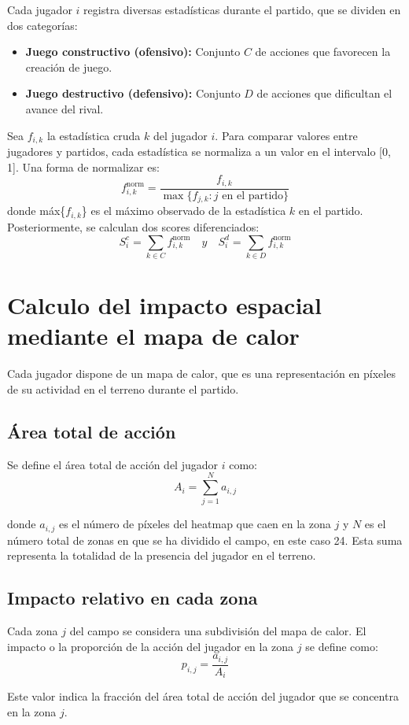 Cada jugador $i$ registra diversas estadísticas durante el partido, que se dividen en dos
categorías:

\begin{itemize}
    \item \textbf{Juego constructivo (ofensivo):} Conjunto $C$ de acciones que favorecen la creación de juego.
    \item \textbf{Juego destructivo (defensivo):} Conjunto $D$ de acciones que dificultan el avance del rival.
\end{itemize}

Sea $f_{i,k}$ la estadística cruda $k$ del jugador $i$. Para comparar valores entre jugadores y
partidos, cada estadística se normaliza a un valor en el intervalo [0, 1]. Una forma de
normalizar es:
\[
f_{i,k}^{\text{norm}} = \frac{f_{i,k}}{\max\{f_{j,k} : j \text{ en el partido}\}}
\]
donde máx\{$f_{i,k}$\} es el máximo observado de la estadística $k$ en el partido.
Posteriormente, se calculan dos scores diferenciados:
\[
S_i^c = \sum_{k \in C} f_{i,k}^{\text{norm}} \quad y \quad S_i^d = \sum_{k \in D} f_{i,k}^{\text{norm}}
\]

\section{Calculo del impacto espacial mediante el mapa de calor}
Cada jugador dispone de un mapa de calor, que es una representación en píxeles de su
actividad en el terreno durante el partido.
\subsection*{Área total de acción}
Se define el área total de acción del jugador $i$ como:
\[
A_i = \sum_{j=1}^{N} a_{i,j}
\]

donde $a_{i,j}$ es el número de píxeles del heatmap que caen en la zona $j$ y $N$ es el número total de zonas en que se ha dividido el campo, en este caso 24. Esta suma representa la
totalidad de la presencia del jugador en el terreno.

\subsection*{Impacto relativo en cada zona}
Cada zona $j$ del campo se considera una subdivisión del mapa de calor. El impacto o la
proporción de la acción del jugador en la zona $j$ se define como:
\[
p_{i,j} = \frac{a_{i,j}}{A_i}
\]

Este valor indica la fracción del área total de acción del jugador que se concentra en la
zona $j$.

